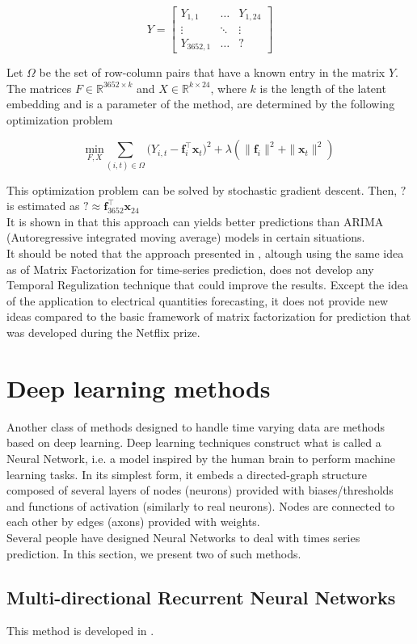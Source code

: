 \documentclass{article}
\begin{document}
$$Y = \begin{bmatrix} Y_{1,1} & \hdots & Y_{1,24} \\ \vdots & \ddots & \vdots \\ Y_{3652,1} & \hdots & ? \end{bmatrix}$$

Let $\Omega$ be the set of row-column pairs that have a known entry in the matrix $Y$. The matrices $F \in \mathbb{R}^{3652 \times k}$ and $X \in \mathbb{R}^{k \times 24}$, where $k$ is the length of the latent embedding and is a parameter of the method, are determined by the following optimization problem

$$\underset{F,X}{\text{min}} \sum_{(i,t) \in \Omega} \Big( Y_{i,t} - \mathbf{f}_i^{\top}\mathbf{x}_t \Big)^2 + \lambda (\|\mathbf{f}_i\|^2 + \|\mathbf{x}_t\|^2) $$

This optimization problem can be solved by stochastic gradient descent. Then, $?$ is estimated as $? \approx \mathbf{f}_{3652}^{\top}\mathbf{x}_{24}$ \\
It is shown in \cite{Elec} that this approach can yields better predictions than ARIMA (Autoregressive integrated moving average) models in certain situations. \\

It should be noted that the approach presented in \cite{Elec}, altough using the same idea as \cite{TRMF} of Matrix Factorization for time-series prediction, does not develop any Temporal Regulization technique that could improve the results. Except the idea of the application to electrical quantities forecasting, it does not provide new ideas compared to the basic framework of matrix factorization for prediction that was developed during the Netflix prize.

\section{Deep learning methods}
Another class of methods designed to handle time varying data are methods based on deep learning.
Deep learning techniques construct what is called a Neural Network, i.e. a model inspired by the human brain to perform machine learning tasks. In its simplest form, it embeds a directed-graph structure composed of several layers of nodes (neurons) provided with biases/thresholds and functions of activation (similarly to real neurons). Nodes are connected to each other by edges (axons) provided with weights. \\
Several people have designed Neural Networks to deal with times series prediction. In this section, we present two of such methods.

\subsection*{Multi-directional Recurrent Neural Networks}
This method is developed in \cite{Yoon2017MultidirectionalRN}.



\end{document}

